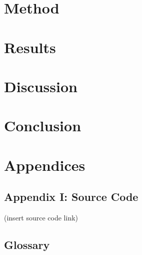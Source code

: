 \documentclass[]{report}
\begin{document}
\section{Method}

\section{Results}

\section{Discussion}

\section{Conclusion}

\section{Appendices}

\subsection{Appendix I: Source Code}

(insert source code link)

\subsection{Glossary}
\end{document}
